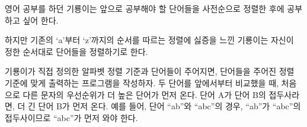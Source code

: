 영어 공부를 하던 기룡이는 앞으로 공부해야 할 단어들을 사전순으로 정렬한 후에 공부하고 싶어 한다.

하지만 기존의 `a'부터 `z'까지의 순서를 따르는 정렬에 싫증을 느낀 기룡이는 자신이 정한 순서대로 단어들을 정렬하기로 한다.

기룡이가 직접 정의한 알파벳 정렬 기준과 단어들이 주어지면, 단어들을 주어진 정렬 기준에 맞게 출력하는 프로그램을 작성하자.
두 단어를 앞에서부터 비교했을 때, 처음으로 다른 문자의 우선순위가 더 높은 단어가 먼저 온다.
단어 A가 단어 B의 접두사라면, 더 긴 단어 B가 먼저 온다.
예를 들어, 단어 ``ab''와 ``abc''의 경우, ``ab''가 ``abc''의 접두사이므로 ``abc''가 먼저 와야 한다.
